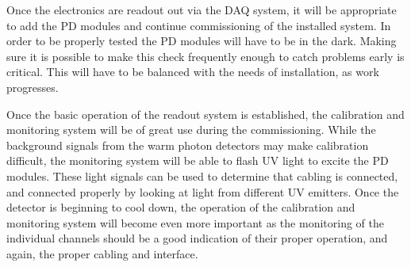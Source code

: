 Once the electronics are readout out via the DAQ system, it will be appropriate to add the PD modules and continue commissioning of the installed system.  In order to be properly tested the PD modules will have to be in the dark.  Making sure it is possible to make this check frequently enough to catch problems early is critical. This will have to be balanced with the needs of installation, as work progresses.  

Once the basic operation of the readout system is established, the calibration and monitoring system will be of great use during the commissioning.  While the background signals from the warm photon detectors may make calibration difficult, the monitoring system will be able to flash UV light to excite the PD modules.  These light signals can be used to determine that cabling is connected, and connected properly by looking at light from different UV emitters.  Once the detector is beginning to cool down, the operation of the calibration and monitoring system will become even more important as the monitoring of the individual channels should be a good indication of their proper operation, and again, the proper cabling and interface.


%




 

